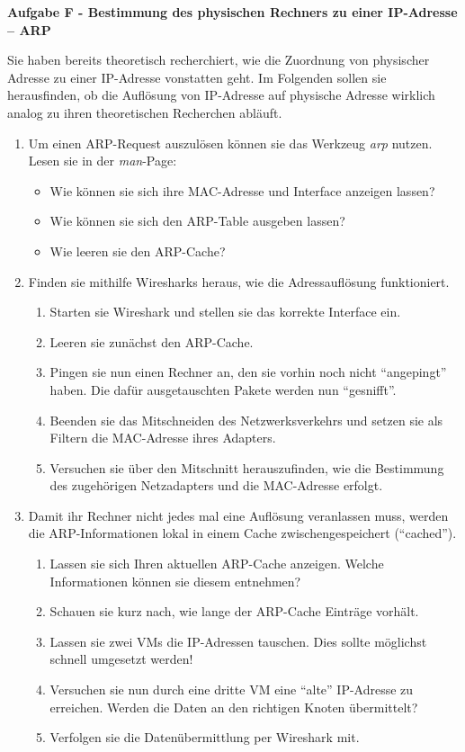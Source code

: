 \documentclass[paper=a4,fontsize=11pt]{scrartcl}%
\numberwithin{equation}{section}
\begin{document}
\begin{center}
\Large{\textbf{Aufgabe F - Bestimmung des physischen Rechners zu einer IP-Adresse -- ARP}}
\end{center}\vskip0.25in
Sie haben bereits theoretisch recherchiert, wie die Zuordnung von physischer Adresse zu einer IP-Adresse vonstatten geht. Im Folgenden sollen sie herausfinden, ob die Auflösung von IP-Adresse auf physische Adresse wirklich analog zu ihren theoretischen Recherchen abläuft.
\begin{enumerate}
	\item Um einen ARP-Request auszulösen können sie das Werkzeug \emph{arp} nutzen. Lesen sie in der \emph{man}-Page:
	\begin{itemize}
		\item Wie können sie sich ihre MAC-Adresse und Interface anzeigen lassen?
		\item Wie können sie sich den ARP-Table ausgeben lassen?
		\item Wie leeren sie den ARP-Cache?
	\end{itemize}
	\item Finden sie mithilfe Wiresharks heraus, wie die Adressauflösung funktioniert.
		\begin{enumerate}
			\item Starten sie Wireshark und stellen sie das korrekte Interface ein.
			\item Leeren sie zunächst den ARP-Cache.
			\item Pingen sie nun einen Rechner an, den sie vorhin noch nicht \enquote{angepingt} haben. Die dafür ausgetauschten Pakete werden nun \enquote{gesnifft}.
			\item Beenden sie das Mitschneiden des Netzwerksverkehrs und setzen sie als Filtern die MAC-Adresse ihres Adapters.
			\item Versuchen sie über den Mitschnitt herauszufinden, wie die Bestimmung des zugehörigen Netzadapters und die MAC-Adresse erfolgt.
		\end{enumerate}
	\item Damit ihr Rechner nicht jedes mal eine Auflösung veranlassen muss, werden die ARP-Informationen lokal in einem Cache zwischengespeichert (\enquote{cached}).
\begin{enumerate}
	\item Lassen sie sich Ihren aktuellen ARP-Cache anzeigen. Welche Informationen können sie diesem entnehmen?
	\item Schauen sie kurz nach, wie lange der ARP-Cache Einträge vorhält.
	\item Lassen sie zwei VMs die IP-Adressen tauschen. Dies sollte möglichst schnell umgesetzt werden!
	\item Versuchen sie nun durch eine dritte VM eine \enquote{alte} IP-Adresse zu erreichen. Werden die Daten an den richtigen Knoten übermittelt?
	\item Verfolgen sie die Datenübermittlung per Wireshark mit.
\end{enumerate}
\end{enumerate}

\printbibliography
\end{document}

